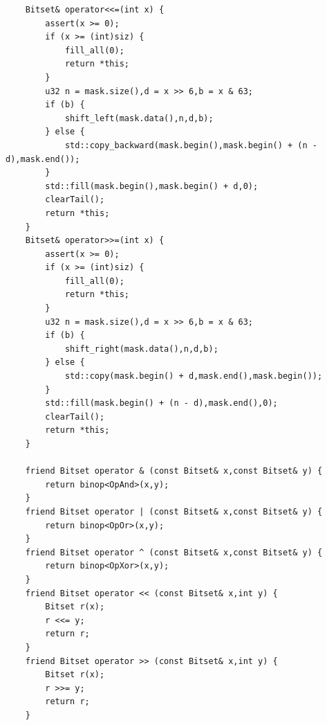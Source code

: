 \begin{lstlisting}
    Bitset& operator<<=(int x) {
        assert(x >= 0);
        if (x >= (int)siz) {
            fill_all(0);
            return *this;
        }
        u32 n = mask.size(),d = x >> 6,b = x & 63;
        if (b) {
            shift_left(mask.data(),n,d,b);
        } else {
            std::copy_backward(mask.begin(),mask.begin() + (n - d),mask.end());
        }
        std::fill(mask.begin(),mask.begin() + d,0);
        clearTail();
        return *this;
    }
    Bitset& operator>>=(int x) {
        assert(x >= 0);
        if (x >= (int)siz) {
            fill_all(0);
            return *this;
        }
        u32 n = mask.size(),d = x >> 6,b = x & 63;
        if (b) {
            shift_right(mask.data(),n,d,b);
        } else {
            std::copy(mask.begin() + d,mask.end(),mask.begin());
        }
        std::fill(mask.begin() + (n - d),mask.end(),0);
        clearTail();
        return *this;
    }

    friend Bitset operator & (const Bitset& x,const Bitset& y) {
        return binop<OpAnd>(x,y);
    }
    friend Bitset operator | (const Bitset& x,const Bitset& y) {
        return binop<OpOr>(x,y);
    }
    friend Bitset operator ^ (const Bitset& x,const Bitset& y) {
        return binop<OpXor>(x,y);
    }
    friend Bitset operator << (const Bitset& x,int y) {
        Bitset r(x);
        r <<= y;
        return r;
    }
    friend Bitset operator >> (const Bitset& x,int y) {
        Bitset r(x);
        r >>= y;
        return r;
    }


\end{lstlisting}
